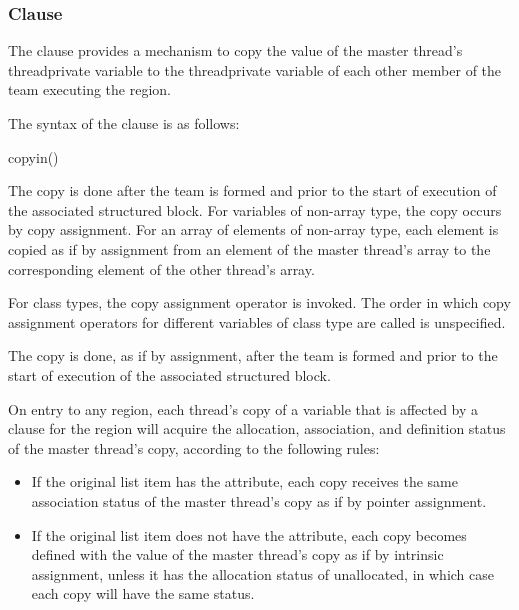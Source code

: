 \subsubsection{ Clause}
\label{subsubsec:copyin clause}
\summary
The  clause provides a mechanism to copy the value of the master thread's
threadprivate variable to the threadprivate variable of each other member of the team
executing the  region.

\syntax
The syntax of the  clause is as follows:

\begin{ompSyntax}
copyin()
\end{ompSyntax}

\descr
\begin{ccppspecific}
The copy is done after the team is formed and prior to the start of execution of the
associated structured block. For variables of non-array type, the copy occurs by copy
assignment. For an array of elements of non-array type, each element is copied as if by
assignment from an element of the master thread's array to the corresponding element of
the other thread's array.
\end{ccppspecific}

\begin{cppspecific}
For class types, the copy assignment operator is invoked. The order in which copy
assignment operators for different variables of class type are called is unspecified.
\end{cppspecific}

\begin{fortranspecific}
The copy is done, as if by assignment, after the team is formed and prior to the start of
execution of the associated structured block.

On entry to any  region, each thread's copy of a variable that is affected by
a  clause for the  region will acquire the allocation, association, and
definition status of the master thread's copy, according to the following rules:

\begin{itemize}
\item If the original list item has the  attribute, each copy receives the same
association status of the master thread's copy as if by pointer assignment.

\item If the original list item does not have the  attribute, each copy becomes
defined with the value of the master thread's copy as if by intrinsic assignment,
unless it has the allocation status of unallocated, in which case each copy
will have the same status.
\end{itemize}
\end{fortranspecific}

